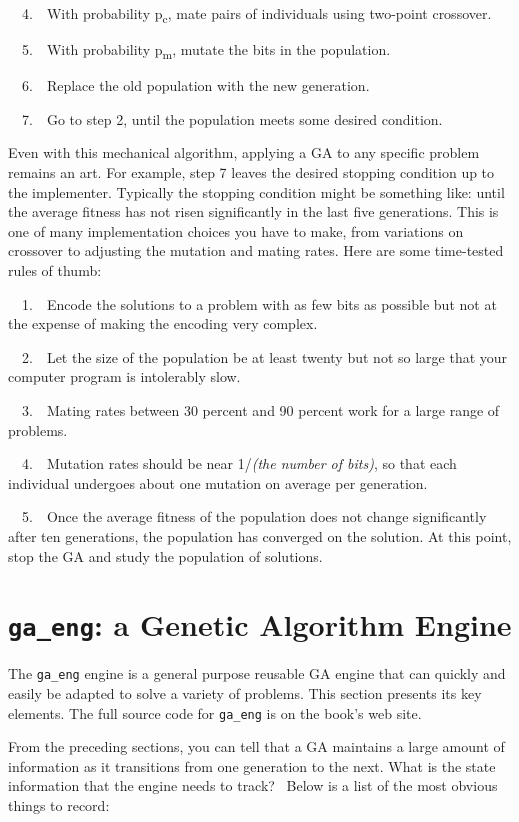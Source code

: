 \ \ 4.\ \ With probability p\textsubscript{c}, mate pairs of individuals
using two-point crossover.

\ \ 5.\ \ With probability p\textsubscript{m}, mutate the bits in the
population.

\ \ 6.\ \ Replace the old population with the new generation.

\ \ 7.\ \ Go to step 2, until the population meets some desired
condition.

Even with this mechanical algorithm, applying a GA to any specific
problem remains an art. For example, step 7 leaves the desired
stopping condition up to the implementer. Typically the stopping
condition might be something like: until the average fitness has not
risen significantly in the last five generations. This is one of
many implementation choices you have to make,
from variations on crossover to adjusting the
mutation and mating rates. Here are some time-tested rules of thumb:

\ \ 1.\ \ Encode the solutions to a problem with as few bits as possible
but not at the expense of making the encoding very complex. 

\ \ 2.\ \ Let the size of the population be at least twenty but not so
large that your computer program is intolerably slow. 

\ \ 3.\ \ Mating rates between 30 percent and 90 percent work for a
large range of problems.

\ \ 4.\ \ Mutation rates should be near 1/\textit{(the number of bits)},
so that each
individual undergoes about one mutation on average per generation.

\ \ 5.\ \ Once the average fitness of the population does not change
significantly after ten generations, the population has converged on
the solution. At this point, stop the GA and study the population of
solutions.


\section{\texttt{ga\_eng}: a Genetic Algorithm Engine}

The \texttt{ga\_eng} engine is a general purpose reusable GA engine that
can quickly and easily be adapted to solve a variety of problems. This
section presents its key elements. The full source
code for \texttt{ga\_eng} is on the book's web site.

From the preceding sections, you can tell that a GA maintains a large
amount of information as it transitions from one generation to the
next. What is the state information that the engine needs to track?
\ Below is a list of the most obvious things to record:

